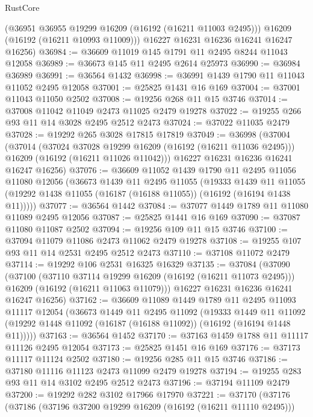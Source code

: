\begin{lexlean}{RustCore}
\begin{coremodule}
        (@36951 @36955 @19299 @16209 (@16192 (@16211 @11003 @2495)))
        @16209
        (@16192 (@16211 @10993 @11009)))
      @16227
      @16231
      @16236
      @16241
      @16247
      @16256)
@36984 := @36609 @11019 @145 @1791 @11 @2495 @8244 @11043 @12058
@36989 := @36673 @145 @11 @2495 @2614 @25973
@36990 := @36984 @36989
@36991 := @36564 @1432
@36998 := @36991 @1439 @1790 @11 @11043 @11052 @2495 @12058
@37001 := @25825 @1431 @16 @169
@37004 := @37001 @11043 @11050 @2502
@37008 := @19256 @268 @11 @15 @3746
@37014 := @37008 @11042 @11049 @2473 @11025 @2479 @19278
@37022 := @19255 @266 @93 @11 @14 @3028 @2495 @2512 @2473
@37024 := @37022 @11035 @2479
@37028 := @19292 @265 @3028 @17815 @17819
@37049 := @36998
    (@37004
      (@37014
        (@37024 @37028 @19299 @16209 (@16192 (@16211 @11036 @2495)))
        @16209
        (@16192 (@16211 @11026 @11042)))
      @16227
      @16231
      @16236
      @16241
      @16247
      @16256)
@37076 := @36609
    @11052
    @1439
    @1790
    @11
    @2495
    @11056
    @11080
    @12056
    (@36673
      @1439
      @11
      @2495
      @11055
      (@19333
        @1439
        @11
        @11055
        (@19292 @1438 @11055 (@16187 (@16188 @11055)) (@16192 (@16194 @1438 @11)))))
@37077 := @36564 @1442
@37084 := @37077 @1449 @1789 @11 @11080 @11089 @2495 @12056
@37087 := @25825 @1441 @16 @169
@37090 := @37087 @11080 @11087 @2502
@37094 := @19256 @109 @11 @15 @3746
@37100 := @37094 @11079 @11086 @2473 @11062 @2479 @19278
@37108 := @19255 @107 @93 @11 @14 @2531 @2495 @2512 @2473
@37110 := @37108 @11072 @2479
@37114 := @19292 @106 @2531 @16325 @16329
@37135 := @37084
    (@37090
      (@37100
        (@37110 @37114 @19299 @16209 (@16192 (@16211 @11073 @2495)))
        @16209
        (@16192 (@16211 @11063 @11079)))
      @16227
      @16231
      @16236
      @16241
      @16247
      @16256)
@37162 := @36609
    @11089
    @1449
    @1789
    @11
    @2495
    @11093
    @11117
    @12054
    (@36673
      @1449
      @11
      @2495
      @11092
      (@19333
        @1449
        @11
        @11092
        (@19292 @1448 @11092 (@16187 (@16188 @11092)) (@16192 (@16194 @1448 @11)))))
@37163 := @36564 @1452
@37170 := @37163 @1459 @1788 @11 @11117 @11126 @2495 @12054
@37173 := @25825 @1451 @16 @169
@37176 := @37173 @11117 @11124 @2502
@37180 := @19256 @285 @11 @15 @3746
@37186 := @37180 @11116 @11123 @2473 @11099 @2479 @19278
@37194 := @19255 @283 @93 @11 @14 @3102 @2495 @2512 @2473
@37196 := @37194 @11109 @2479
@37200 := @19292 @282 @3102 @17966 @17970
@37221 := @37170
    (@37176
      (@37186
        (@37196 @37200 @19299 @16209 (@16192 (@16211 @11110 @2495)))

\end{coremodule}
\end{lexlean}
